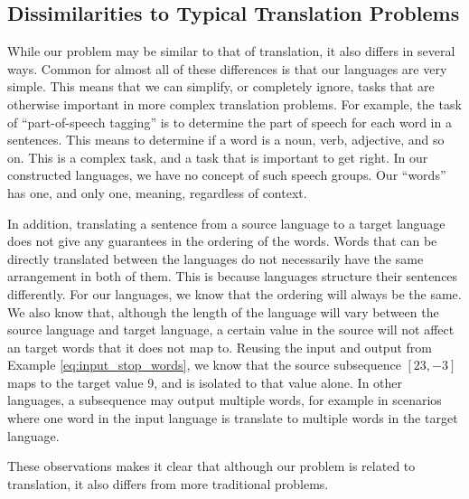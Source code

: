 \subsection{Dissimilarities to Typical Translation Problems}
While our problem may be similar to that of translation, it also differs in several ways. Common for almost all of these differences is that our languages are very simple. This means that we can simplify, or completely ignore, tasks that are otherwise important in more complex translation problems. For example, the task of ``part-of-speech tagging'' is to determine the part of speech for each word in a sentences. This means to determine if a word is a noun, verb, adjective, and so on. This is a complex task, and a task that is important to get right. In our constructed languages, we have no concept of such speech groups. Our ``words'' has one, and only one, meaning, regardless of context. 

In addition, translating a sentence from a source language to a target language does not give any guarantees in the ordering of the words. Words that can be directly translated between the languages do not necessarily have the same arrangement in both of them. This is because languages structure their sentences differently. For our languages, we know that the ordering will always be the same. We also know that, although the length of the language will vary between the source language and target language, a certain value in the source will not affect an target words that it does not map to. Reusing the input and output from Example \ref{eq:input_stop_words}, we know that the source subsequence \([23, -3]\) maps to the target value 9, and is isolated to that value alone. In other languages, a subsequence may output multiple words, for example in scenarios where one word in the input language is translate to multiple words in the target language.

These observations makes it clear that although our problem is related to translation, it also differs from more traditional problems. 